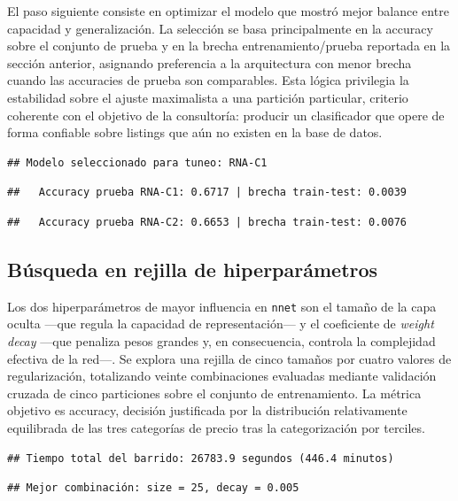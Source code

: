 \documentclass[
]{article}
\begin{document}
El paso siguiente consiste en optimizar el modelo que mostró mejor
balance entre capacidad y generalización. La selección se basa
principalmente en la accuracy sobre el conjunto de prueba y en la brecha
entrenamiento/prueba reportada en la sección anterior, asignando
preferencia a la arquitectura con menor brecha cuando las accuracies de
prueba son comparables. Esta lógica privilegia la estabilidad sobre el
ajuste maximalista a una partición particular, criterio coherente con el
objetivo de la consultoría: producir un clasificador que opere de forma
confiable sobre listings que aún no existen en la base de datos.

\begin{verbatim}
## Modelo seleccionado para tuneo: RNA-C1
\end{verbatim}

\begin{verbatim}
##   Accuracy prueba RNA-C1: 0.6717 | brecha train-test: 0.0039
\end{verbatim}

\begin{verbatim}
##   Accuracy prueba RNA-C2: 0.6653 | brecha train-test: 0.0076
\end{verbatim}

\subsection{Búsqueda en rejilla de
hiperparámetros}\label{buxfasqueda-en-rejilla-de-hiperparuxe1metros}

Los dos hiperparámetros de mayor influencia en \texttt{nnet} son el
tamaño de la capa oculta ---que regula la capacidad de representación---
y el coeficiente de \emph{weight decay} ---que penaliza pesos grandes y,
en consecuencia, controla la complejidad efectiva de la red---. Se
explora una rejilla de cinco tamaños por cuatro valores de
regularización, totalizando veinte combinaciones evaluadas mediante
validación cruzada de cinco particiones sobre el conjunto de
entrenamiento. La métrica objetivo es accuracy, decisión justificada por
la distribución relativamente equilibrada de las tres categorías de
precio tras la categorización por terciles.

\begin{verbatim}
## Tiempo total del barrido: 26783.9 segundos (446.4 minutos)
\end{verbatim}

\begin{verbatim}
## Mejor combinación: size = 25, decay = 0.005
\end{verbatim}
\end{document}
